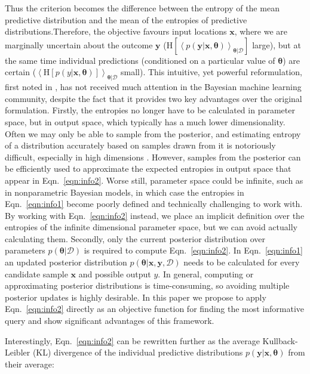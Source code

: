\documentclass[twoside]{article}
\newcommand{\param}{\bm{\theta}}
\newcommand{\x}{\bm{x}}
\newcommand{\y}{\bm{y}}
\newcommand{\data}{\mathcal{D}}
\newcommand{\Hu}{\mathrm{H}}
\begin{document}
Thus the criterion becomes the difference between the entropy of the mean predictive distribution and the mean of the entropies of predictive distributions.Therefore, the objective favours input locations $\x$, where we are marginally uncertain about the outcome $\y$ ($\Hu\left[\left\langle p(\y\vert\x,\param)\right\rangle_{\param\vert\data}\right]$ large), but at the same time individual predictions (conditioned on a particular value of $\param$) are certain ($\left\langle \Hu\left[p(y\vert\x,\param)\right]\right\rangle_{\param\vert\data}$ small). This intuitive, yet powerful reformulation, first noted in \cite{lindley1956}, has not received much attention in the Bayesian machine learning community, despite the fact that it provides two key advantages over the original formulation. Firstly, the entropies no longer have to be calculated in parameter space, but in output space, which typically has a much lower dimensionality. Often we may only be able to sample from the posterior, and estimating entropy of a distribution accurately based on samples drawn from it is notoriously difficult, especially in high dimensions \cite{panzeri2007}. However, samples from the posterior can be efficiently used to approximate the expected entropies in output space that appear in Eqn.\  \eqref{eqn:info2}. Worse still, parameter space could be infinite, such as in nonparametric Bayesian models, in which case the entropies in Eqn.\  \eqref{eqn:info1} become poorly defined and technically challenging to work with. By working with Eqn.\  \eqref{eqn:info2} instead, we place an implicit definition over the entropies of the infinite dimensional parameter space, but we can avoid actually calculating them. Secondly, only the current posterior distribution over parameters $p(\param\vert\data)$ is required to compute Eqn.\  \eqref{eqn:info2}. In Eqn.\  \eqref{eqn:info1} an updated posterior distribution $p(\param\vert\x,\y,\data)$ needs to be calculated for every candidate sample $\x$ and possible output $y$. In general, computing or approximating posterior distributions is time-consuming, so avoiding multiple posterior updates is highly desirable.  In this paper we propose to apply Eqn.\ \eqref{eqn:info2} directly as an objective function for finding the most informative query and show significant advantages of this framework.

Interestingly, Eqn.\ \eqref{eqn:info2} can be rewritten further as the average Kullback-Leibler (KL) divergence of the individual predictive distributions $p(\y\vert\x,\param)$ from their average:
\end{document}
